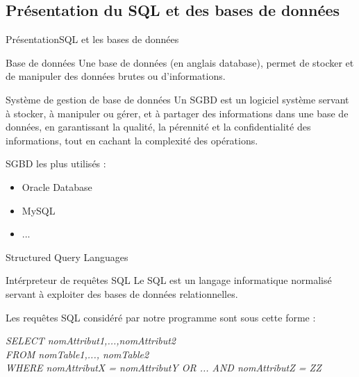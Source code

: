 \documentclass[10pt,handout]{beamer}
\begin{document}
\subsection{Présentation du SQL et des bases de données}
\begin{frame}{Présentation}{SQL et les bases de données}
  \begin{block}{Base de données}
    Une base de données (en anglais database), permet de stocker et de manipuler des données brutes ou d'informations.
  \end{block}

  \begin{block}{Système de gestion de base de données}
    Un SGBD est un logiciel système servant à stocker, à manipuler ou gérer, et à partager des informations dans une base de données, en garantissant la qualité, la pérennité et la confidentialité des informations, tout en cachant la complexité des opérations.
  \end{block}

  SGBD les plus utilisés :
    \begin{itemize}
      \item Oracle Database
      \item MySQL
      \item ...
    \end{itemize}

\end{frame}

\begin{frame}{Structured Query Languages}
  \begin{block}{Intérpreteur de requêtes SQL}
    Le SQL est un langage informatique normalisé servant à exploiter des bases de données relationnelles.
  \end{block}

  Les requêtes SQL considéré par notre programme sont sous cette forme :

  \begin{block}

    \textit{SELECT nomAttribut1,...,nomAttribut2 \\ FROM nomTable1,..., nomTable2 \\ WHERE nomAttributX = nomAttributY OR ... AND nomAttributZ = ZZ}
  \end{block}

\end{frame}

\end{document}
